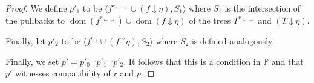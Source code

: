 \documentclass[10pt,a4paper]{amsart}
\newcommand\cat[1]{{}^\curvearrowright #1}
\DeclareMathOperator{\dom}{dom}
\begin{document}
\begin{proof}
We define $p'_1$ to be $\langle f^{r_{\leftarrow\rightarrow}}\cup (f\downarrow \eta), S_1\rangle$ where $S_1$ is the intersection of the pullbacks to  $\dom(f^{r_{\leftarrow\rightarrow}})\cup \dom(f\downarrow\eta)$ of the trees $T^{r_{\leftarrow\rightarrow}}$ and $(T\downarrow\eta)$. 

Finally, let $p'_2$ to be $\langle f^{r_{\rightarrow}}\cup (f\cat \eta), S_2\rangle$ where $S_2$ is defined analogously.

Finally, we set $p'=p'_0{}^\smallfrown p'_1{}^\smallfrown p'_2$. It follows that this is a condition in $\mathbb{P}$ and that $p'$ witnesses compatibility of $r$ and $p$.
\end{proof}
\end{document}
